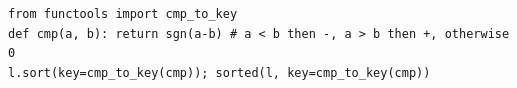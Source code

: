 \begin{verbatim}
from functools import cmp_to_key
def cmp(a, b): return sgn(a-b) # a < b then -, a > b then +, otherwise 0
l.sort(key=cmp_to_key(cmp)); sorted(l, key=cmp_to_key(cmp))
\end{verbatim}